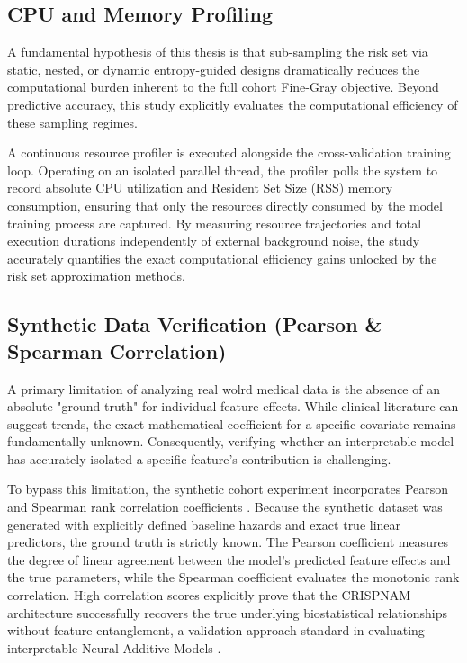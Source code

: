 \documentclass[a4paper,twoside,12pt]{report}
\begin{document}
\subsection{CPU and Memory Profiling}
A fundamental hypothesis of this thesis is that sub-sampling the risk set via static, nested, or dynamic entropy-guided designs dramatically reduces the computational burden inherent to the full cohort Fine-Gray objective. Beyond predictive accuracy, this study explicitly evaluates the computational efficiency of these sampling regimes.

A continuous resource profiler is executed alongside the cross-validation training loop. Operating on an isolated parallel thread, the profiler polls the system to record absolute CPU utilization and Resident Set Size (RSS) memory consumption, ensuring that only the resources directly consumed by the model training process are captured. By measuring resource trajectories and total execution durations independently of external background noise, the study accurately quantifies the exact computational efficiency gains unlocked by the risk set approximation methods.

\subsection{Synthetic Data Verification (Pearson \& Spearman Correlation)}
A primary limitation of analyzing real wolrd medical data is the absence of an absolute "ground truth" for individual feature effects. While clinical literature can suggest trends, the exact mathematical coefficient for a specific covariate remains fundamentally unknown. Consequently, verifying whether an interpretable model has accurately isolated a specific feature's contribution is challenging.

To bypass this limitation, the synthetic cohort experiment incorporates Pearson and Spearman rank correlation coefficients \citep{rosner2015fundamentals}. Because the synthetic dataset was generated with explicitly defined baseline hazards and exact true linear predictors, the ground truth is strictly known. The Pearson coefficient measures the degree of linear agreement between the model's predicted feature effects and the true parameters, while the Spearman coefficient evaluates the monotonic rank correlation. High correlation scores explicitly prove that the CRISPNAM architecture successfully recovers the true underlying biostatistical relationships without feature entanglement, a validation approach standard in evaluating interpretable Neural Additive Models \citep{agarwal2021neural}.
\end{document}
